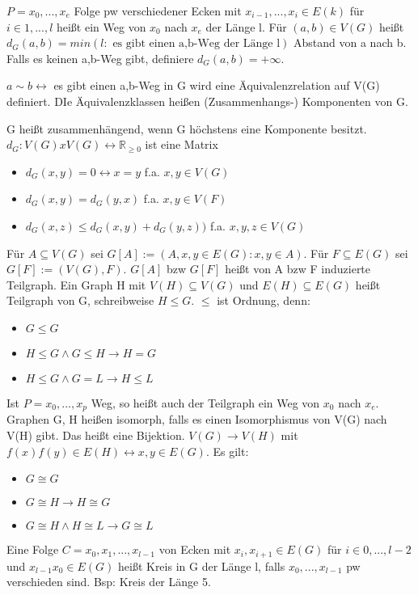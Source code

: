 \documentclass[10pt,landscape]{article}
\begin{document}
\begin{multicols}{3}
$P=x_0,...,x_e$ Folge pw verschiedener Ecken mit $x_{i-1},...,x_i \in E(k)$ für $i\in{1,...,l}$ heißt ein Weg von $x_0$ nach $x_e$ der Länge l. Für $(a,b)\in V(G)$ heißt $d_G(a,b)=min(l: \text{ es gibt einen a,b-Weg der Länge l} )$ Abstand von a nach b. Falls es keinen a,b-Weg gibt, definiere $d_G(a,b)=+\infty$.

$a\sim b \leftrightarrow$ es gibt einen a,b-Weg in G wird eine Äquivalenzrelation auf V(G) definiert. DIe Äquivalenzklassen heißen (Zusammenhangs-) Komponenten von G.

G heißt zusammenhängend, wenn G höchstens eine Komponente besitzt. $d_G: V(G) x V(G) \leftrightarrow \mathbb{R}_{\geq 0}$ ist eine Matrix
\begin{itemize}
    \item $d_G(x,y)=0 \leftrightarrow x=y$ f.a. $x,y \in V(G)$
    \item $d_G(x,y)=d_G(y,x)$ f.a. $x,y\in V(F)$
    \item $d_G(x,z)\leq d_G(x,y) + d_G(y,z))$ f.a. $x,y,z \in V(G)$
\end{itemize}

Für $A\subseteq V(G)$ sei $G[A]:= (A, {x,y\in E(G):x,y\in A})$. Für $F\subseteq E(G)$ sei $G[F]:=(V(G), F)$. $G[A]$ bzw $G[F]$ heißt von A bzw F induzierte Teilgraph. Ein Graph H mit $V(H)\subseteq V(G)$ und $E(H)\subseteq E(G)$ heißt Teilgraph von G, schreibweise $H\leq G$. $\leq$ ist Ordnung, denn:
\begin{itemize}
    \item $G\leq G$
    \item $H\leq G \wedge G\leq H \rightarrow H=G$
    \item $H\leq G \wedge G=L \rightarrow H\leq L$
\end{itemize}

Ist $P=x_0,...,x_p$ Weg, so heißt auch der Teilgraph ein Weg von $x_0$ nach $x_e$.
Graphen G, H heißen isomorph, falls es einen Isomorphismus von V(G) nach V(H) gibt. Das heißt eine Bijektion.
$V(G)\rightarrow V(H)$ mit $f(x)f(y)\in E(H)\leftrightarrow x,y \in E(G)$. Es gilt:
\begin{itemize}
    \item $G\cong G$
    \item $G\cong H \rightarrow H \cong G$
    \item $G\cong H \wedge H\cong L \rightarrow G\cong L$
\end{itemize}

Eine Folge $C=x_0,x_1,...,x_{l-1}$ von Ecken mit $x_i,x_{i+1}\in E(G)$ für $i\in {0,...,l-2}$ und $x_{l-1}x_0 \in E(G)$ heißt Kreis in G der Länge l, falls $x_0,...,x_{l-1}$ pw verschieden sind. Bsp: Kreis der Länge 5.


\end{multicols}
\end{document}
